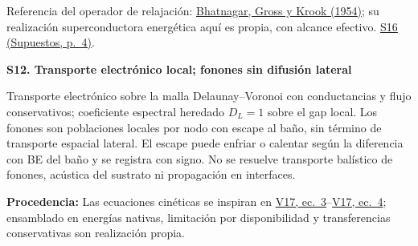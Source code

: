 \documentclass[11pt,a4paper]{article}
\newcommand{\origin}[1]{\par{\footnotesize\raggedright\color{ink}\textbf{Procedencia:} #1\par}}
\newcommand{\V}[1]{\href{https://arxiv.org/abs/1611.06060}{V17, ec.~#1}}
\newcommand{\sref}[2]{\href{Supuestos.pdf\#nameddest=#1}{#1 (Supuestos, p.~#2)}}
\newcommand{\assumption}[2]{\par\vspace{6pt}\hypertarget{#1}{\textbf{\color{ink}#1. #2}}\par}
\newcommand{\smallnote}[1]{{\small #1\par}}
\begin{document}
\smallnote{Referencia del operador de relajación: \href{https://doi.org/10.1103/PhysRev.94.511}{Bhatnagar, Gross y Krook (1954)}; su realización superconductora energética aquí es propia, con alcance efectivo. \sref{S16}{4}.}
\assumption{S12}{Transporte electrónico local; fonones sin difusión lateral}
\smallnote{Transporte electrónico sobre la malla Delaunay--Voronoi con conductancias y flujo conservativos; coeficiente espectral heredado $D_L=1$ sobre el gap local. Los fonones son poblaciones locales por nodo con escape al baño, sin término de transporte espacial lateral. El escape puede enfriar o calentar según la diferencia con BE del baño y se registra con signo. No se resuelve transporte balístico de fonones, acústica del sustrato ni propagación en interfaces.}
\vfill
\origin{Las ecuaciones cinéticas se inspiran en \V{3}--\V{4}; ensamblado en energías nativas, limitación por disponibilidad y transferencias conservativas son realización propia.}
\newpage
\end{document}
